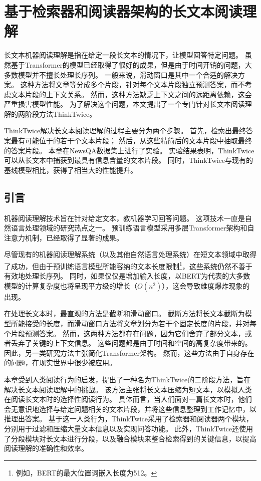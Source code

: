 \chapter{基于检索器和阅读器架构的长文本阅读理解}
长文本机器阅读理解是指在给定一段长文本的情况下，让模型回答特定问题。
虽然基于Transformer的模型已经取得了很好的成果，但是由于时间开销的问题，大多数模型并不擅长处理长序列。
一般来说，滑动窗口是其中一个合适的解决方案。
这种方法将文章等分成多个片段，针对每个文本片段独立预测答案，而不考虑文本片段的上下文关系。
然而，这种方法缺乏上下文之间的远距离依赖，这会严重损害模型性能。
为了解决这个问题，本文提出了一个专门针对长文本阅读理解的两阶段方法ThinkTwice。

ThinkTwice解决长文本阅读理解的过程主要分为两个步骤。
首先，检索出最终答案最有可能位于的若干个文本片段；
然后，从这些精简后的文本片段中抽取最终的答案片段。
本章在NewsQA数据集上进行了实验。
实验结果表明，ThinkTwice可以从长文本中捕获到最具有信息含量的文本片段。
同时，ThinkTwice与现有的基线模型相比，获得了相当大的性能提升。

\section{引言}
机器阅读理解技术\cite{hermann2015teaching}旨在针对给定文本，教机器学习回答问题。
这项技术一直是自然语言处理领域的研究热点之一。
预训练语言模型采用多层Transformer架构和自注意力机制\cite{vaswani2017attention}，已经取得了显著的成果。

尽管现有的机器阅读理解系统（以及其他自然语言处理系统）在短文本领域中取得了成功，但由于预训练语言模型所能容纳的文本长度限制\footnote{例如，BERT的最大位置词嵌入长度为512。}，这些系统仍然不善于有效地处理长序列。
同时，如果仅仅是增加输入长度，以BERT为代表的大多数模型的计算复杂度也将呈现平方级的增长（$O(n^2)$），这会导致维度爆炸现象的出现。

在处理长文本时，最直观的方法是截断\cite{rajpurkar2016squad,xie2019unsupervised}和滑动窗口\cite{joshi2019bert}。
截断方法将长文本截断为模型所能接受的长度，而滑动窗口方法将文章划分为若干个固定长度的片段，并对每个片段预测答案。
然而，这两种方法都存在问题，因为它们舍弃了部分文本，或者丢弃了关键的上下文信息。
这些问题都是由于时间和空间的高复杂度带来的。
因此，另一类研究方法主张简化Transformer架构\cite{beltagy2020longformer,zaheer2020big,ding2020ernie}。
然而，这些方法由于自身存在的问题，在现实世界中很少被应用。

本章受到人类阅读行为的启发，提出了一种名为ThinkTwice的二阶段方法，旨在解决长文本阅读理解中的挑战。
该方法主张将长文本压缩为短文本，以模拟人类在阅读长文本时的选择性阅读行为。
具体而言，当人们面对一篇长文本时，他们会无意识地选择与给定问题相关的文本片段，并将这些信息整理到工作记忆\cite{atkinson1968human}中，以推理出答案。
基于这一人类行为，ThinkTwice采用了检索器和阅读器两个模块，分别用于过滤和压缩大量文本信息以及实现问答功能。
此外，ThinkTwice还使用了分段模块对长文本进行分段，以及融合模块来整合检索得到的关键信息，以提高阅读理解的准确性和效率。

